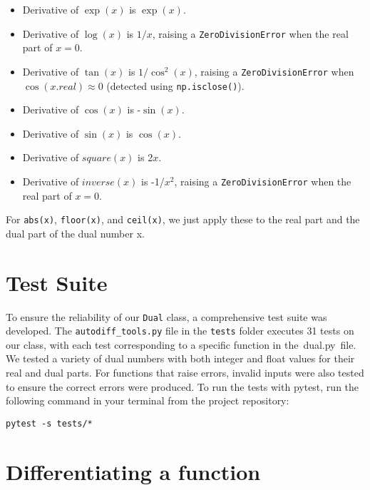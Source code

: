 \documentclass[a4paper,12pt]{article}
\begin{document}
\begin{itemize}
    \item Derivative of $\exp(x)$ is $\exp(x)$.
    \item Derivative of $\log(x)$ is $1/x$, raising a \texttt{ZeroDivisionError} when the real part of $x=0$.
    \item Derivative of $\tan(x)$ is $1/\cos^2(x)$, raising a \texttt{ZeroDivisionError} when $\cos(x.real) \approx 0$ (detected using \texttt{np.isclose()}).
    \item Derivative of $\cos(x)$ is -$\sin(x)$.
    \item Derivative of $\sin(x)$ is $\cos(x)$.
    \item Derivative of $square(x)$ is 2$x$.
    \item Derivative of $inverse(x)$ is -1/$x^2$, raising a \texttt{ZeroDivisionError} when the real part of $x=0$.


\end{itemize}

For \texttt{abs(x)}, \texttt{floor(x)}, and \texttt{ceil(x)}, we just apply these to the real part and the dual part of the dual number x.

\section{Test Suite}
To ensure the reliability of our \texttt{Dual} class, a comprehensive test suite was developed. 
The \texttt{autodiff\_tools.py} file in the \texttt{tests} folder executes 31 tests on our class, with each test corresponding to a specific function in the dual.py file. We tested a variety of dual numbers with both integer and float values for their real and dual parts. For functions that raise errors, invalid inputs were also tested to ensure the correct errors were produced.
To run the tests with pytest, run the following command in your terminal from the project repository:

\begin{verbatim}
pytest -s tests/*
\end{verbatim}
\section{Differentiating a function}
\end{document}
